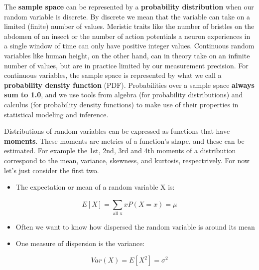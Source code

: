 \documentclass[]{book}
\providecommand{\tightlist}{%
  \setlength{\itemsep}{0pt}\setlength{\parskip}{0pt}}
\begin{document}
The \textbf{sample space} can be represented by a \textbf{probability distribution} when our random variable is discrete. By discrete we mean that the variable can take on a limited (finite) number of values. Meristic traits like the number of bristles on the abdomen of an insect or the number of action potentials a neuron experiences in a single window of time can only have positive integer values. Continuous random variables like human height, on the other hand, can in theory take on an infinite number of values, but are in practice limited by our measurement precision. For continuous variables, the sample space is represented by what we call a \textbf{probability density function} (PDF). Probabilities over a sample space \textbf{always sum to 1.0}, and we use tools from algebra (for probability distributions) and calculus (for probability density functions) to make use of their properties in statistical modeling and inference.

Distributions of random variables can be expressed as functions that have \textbf{moments}. These moments are metrics of a function's shape, and these can be estimated. For example the 1st, 2nd, 3rd and 4th moments of a distribution correspond to the mean, variance, skewness, and kurtosis, respectrively. For now let's just consider the first two.

\begin{itemize}
\tightlist
\item
  The expectation or mean of a random variable X is:
\end{itemize}

\[E[X] = \sum_{\text{all x}}^{}xP(X=x) = \mu\]

\begin{itemize}
\tightlist
\item
  Often we want to know how dispersed the random variable is around its mean
\item
  One measure of dispersion is the variance:
\end{itemize}

\[Var(X) = E[X^2] = \sigma^2\]
\end{document}
